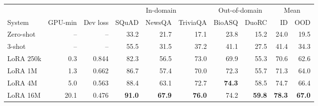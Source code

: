 \begin{tabular}{lrrrrrrrrr}
\toprule
 & & & \multicolumn{3}{c}{In-domain} & \multicolumn{2}{c}{Out-of-domain} & \multicolumn{2}{c}{Mean} \\
\cmidrule(lr){4-6}\cmidrule(lr){7-8}\cmidrule(lr){9-10}
System & GPU-min & Dev loss & SQuAD & NewsQA & TriviaQA & BioASQ & DuoRC & ID & OOD \\
\midrule
Zero-shot & -- & -- & 33.2 & 21.7 & 17.1 & 23.8 & 15.2 & 24.0 & 19.5 \\
3-shot & -- & -- & 55.5 & 31.5 & 37.2 & 41.1 & 27.5 & 41.4 & 34.3 \\
\midrule
LoRA 250k & 0.3 & 0.844 & 82.3 & 56.5 & 73.0 & 69.9 & 55.3 & 70.6 & 62.6 \\
LoRA 1M & 1.3 & 0.662 & 86.7 & 57.4 & 70.0 & 72.3 & 55.7 & 71.3 & 64.0 \\
LoRA 4M & 5.0 & 0.563 & 88.4 & 63.1 & 72.7 & \textbf{74.3} & 58.5 & 74.7 & 66.4 \\
LoRA 16M & 20.1 & 0.476 & \textbf{91.0} & \textbf{67.9} & \textbf{76.0} & 74.2 & \textbf{59.8} & \textbf{78.3} & \textbf{67.0} \\
\bottomrule
\end{tabular}